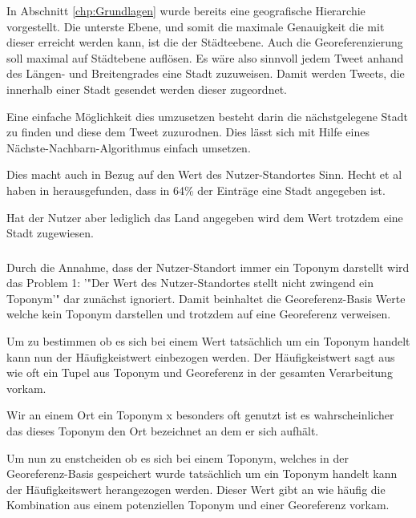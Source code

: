 						In Abschnitt \ref{chp:Grundlagen} wurde bereits eine geografische Hierarchie vorgestellt.
						Die unterste Ebene, und somit die maximale Genauigkeit die mit dieser erreicht werden kann, ist die der Städteebene.
						Auch die Georeferenzierung soll maximal auf Städtebene auflösen.
						Es wäre also sinnvoll jedem Tweet anhand des Längen- und Breitengrades eine Stadt zuzuweisen.
						Damit werden Tweets, die innerhalb einer Stadt gesendet werden dieser zugeordnet.
						
						Eine einfache Möglichkeit dies umzusetzen besteht darin die nächstgelegene Stadt zu finden und diese dem Tweet zuzurodnen.
						Dies lässt sich mit Hilfe eines Nächste-Nachbarn-Algorithmus einfach umsetzen.

						Dies macht auch in Bezug auf den Wert des Nutzer-Standortes Sinn. 
						Hecht et al haben in \cite{Hecht2011} herausgefunden, dass in 64\% der Einträge eine Stadt angegeben ist.  
						
						Hat der Nutzer aber lediglich das Land angegeben wird dem Wert trotzdem eine Stadt zugewiesen. 

					\subsubsection{}

						Durch die Annahme, dass der Nutzer-Standort immer ein Toponym darstellt wird das Problem 1: '"Der Wert des Nutzer-Standortes stellt nicht zwingend ein Toponym'" dar zunächst ignoriert.
						Damit beinhaltet die Georeferenz-Basis Werte welche kein Toponym darstellen und trotzdem auf eine Georeferenz verweisen. 

						Um zu bestimmen ob es sich bei einem Wert tatsächlich um ein Toponym handelt kann nun der Häufigkeistwert einbezogen werden.
						Der Häufigkeistwert sagt aus wie oft ein Tupel aus Toponym und Georeferenz in der gesamten Verarbeitung vorkam.

						Wir an einem Ort ein Toponym x besonders oft genutzt ist es wahrscheinlicher das dieses Toponym den Ort bezeichnet an dem er sich aufhält. 



					Um nun zu enstcheiden ob es sich bei einem Toponym, welches in der Georeferenz-Basis gespeichert wurde tatsächlich um ein Toponym handelt kann der Häufigkeitswert herangezogen werden. 
					Dieser Wert gibt an wie häufig die Kombination aus einem potenziellen Toponym und einer Georeferenz vorkam.
					
